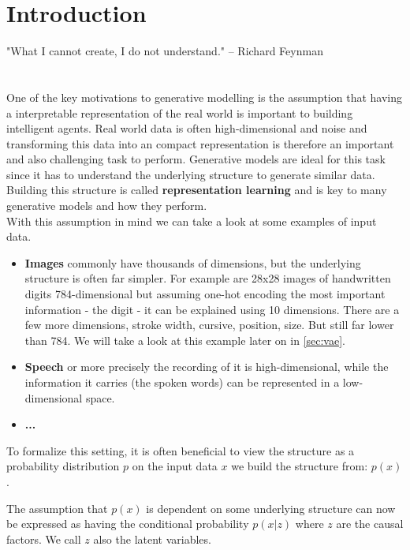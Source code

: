 \section{Introduction}
\label{sec:introduction}

"What I cannot create, I do not understand." -- Richard Feynman \\\\\\

One of the key motivations to generative modelling is the assumption that having a interpretable representation of the real world is important to building intelligent agents.
Real world data is often high-dimensional and noise and transforming this data into an compact representation is therefore an important and also challenging task to perform.
Generative models are ideal for this task since it has to understand the underlying structure to generate similar data.
Building this structure is called \textbf{representation learning} and is key to many generative models and how they perform.\\

With this assumption in mind we can take a look at some examples of input data.
\begin{itemize}
  \item \textbf{Images} commonly have thousands of dimensions, but the underlying structure is often far simpler. For example are 28x28 images of handwritten digits 784-dimensional but assuming one-hot encoding the most important information - the digit - it can be explained using 10 dimensions. There are a few more dimensions, stroke width, cursive, position, size. But still far lower than 784. We will take a look at this example later on in \ref{sec:vae}.
  \item \textbf{Speech} or more precisely the recording of it is high-dimensional, while the information it carries (the spoken words) can be represented in a low-dimensional space.
  \item \textbf{...}
\end{itemize}

To formalize this setting, it is often beneficial to view the structure as a probability distribution $p$ on the input data $x$ we build the structure 
from: $p(x)$.

The assumption that $p(x)$ is dependent on some underlying structure can now be expressed as having the conditional probability $p(x|z)$ where $z$ are the causal factors.
We call $z$ also the latent variables.\\

